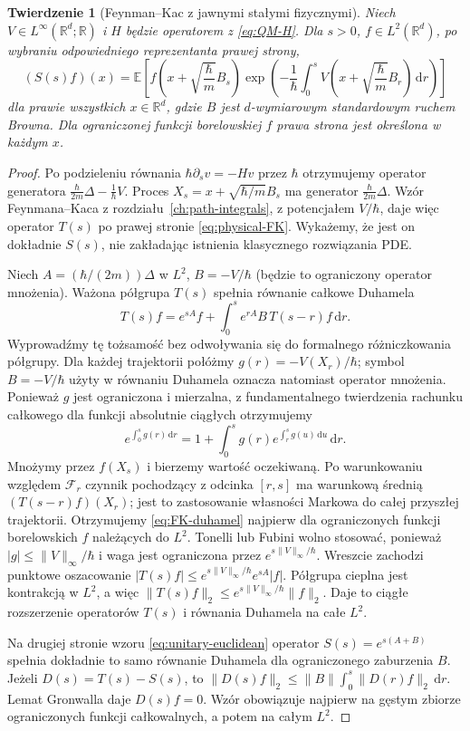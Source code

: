 \documentclass[11pt,a4paper,oneside]{report}
\numberwithin{equation}{chapter}
\theoremstyle{plain}
\newtheorem{twierdzenie}{Twierdzenie}[chapter]
\theoremstyle{definition}
\theoremstyle{remark}
\newcommand{\R}{\mathbb{R}}
\newcommand{\E}{\mathbb{E}}
\newcommand{\calF}{\mathcal{F}}
\newcommand{\dd}{\mathrm{d}}
\begin{document}
\begin{twierdzenie}[Feynman--Kac z jawnymi stałymi fizycznymi]\label{thm:volIII:16:01}
\label{th:physical-FK}
Niech $V\in L^\infty(\R^d;\R)$ i $H$ będzie operatorem
z \eqref{eq:QM-H}. Dla $s>0$, $f\in L^2(\R^d)$,
po wybraniu odpowiedniego reprezentanta prawej strony,
\[
 (S(s)f)(x)=\E\left[
 f\left(x+\sqrt{\frac{\hbar}{m}}B_s\right)
 \exp\left(-\frac1\hbar\int_0^s
 V\left(x+\sqrt{\frac{\hbar}{m}}B_r\right)\,\dd r\right)
 \right]
\tag{16.3}\label{eq:physical-FK}
\]
dla prawie wszystkich $x\in\R^d$, gdzie $B$ jest
$d$-wymiarowym standardowym ruchem Browna.
Dla ograniczonej funkcji borelowskiej $f$ prawa strona
jest określona w każdym $x$.
\end{twierdzenie}
\begin{proof}
Po podzieleniu równania $\hbar\partial_s v=-Hv$ przez
$\hbar$ otrzymujemy operator generatora
$\frac{\hbar}{2m}\Delta-\frac1\hbar V$.
Proces $X_s=x+\sqrt{\hbar/m}B_s$ ma generator
$\frac{\hbar}{2m}\Delta$.
Wzór Feynmana--Kaca z rozdziału~\ref{ch:path-integrals},
z potencjałem $V/\hbar$, daje więc operator $T(s)$ po
prawej stronie \eqref{eq:physical-FK}. Wykażemy, że jest
on dokładnie $S(s)$, nie zakładając istnienia klasycznego
rozwiązania PDE.

Niech $A=(\hbar/(2m))\Delta$ w $L^2$, $B=-V/\hbar$
(będzie to ograniczony operator mnożenia). Ważona
półgrupa $T(s)$ spełnia równanie całkowe Duhamela
\[
 T(s)f=e^{sA}f+\int_0^s e^{rA}B\,T(s-r)f\,\dd r.
\tag{16.4}\label{eq:FK-duhamel}
\]
Wyprowadźmy tę tożsamość bez odwoływania się do
formalnego różniczkowania półgrupy. Dla każdej trajektorii
połóżmy $g(r)=-V(X_r)/\hbar$; symbol $B=-V/\hbar$
użyty w równaniu Duhamela oznacza natomiast operator mnożenia.
Ponieważ $g$ jest ograniczona i mierzalna, z fundamentalnego
twierdzenia rachunku całkowego dla funkcji absolutnie
ciągłych otrzymujemy
\[
 e^{\int_0^s g(r)\,\dd r}
 =1+\int_0^s g(r)e^{\int_r^s g(u)\,\dd u}\,\dd r.
\]
Mnożymy przez $f(X_s)$ i bierzemy wartość oczekiwaną.
Po warunkowaniu względem $\calF_r$ czynnik pochodzący
z odcinka $[r,s]$ ma warunkową średnią
$(T(s-r)f)(X_r)$; jest to zastosowanie własności Markowa
do całej przyszłej trajektorii. Otrzymujemy
\eqref{eq:FK-duhamel} najpierw dla ograniczonych
funkcji borelowskich $f$ należących do $L^2$.
Tonelli lub Fubini wolno stosować, ponieważ
$|g|\le\|V\|_\infty/\hbar$ i waga jest ograniczona przez
$e^{s\|V\|_\infty/\hbar}$.
Wreszcie zachodzi punktowe oszacowanie
$|T(s)f|\le e^{s\|V\|_\infty/\hbar}e^{sA}|f|$.
Półgrupa cieplna jest kontrakcją w $L^2$, a więc
$\|T(s)f\|_2\le e^{s\|V\|_\infty/\hbar}\|f\|_2$.
Daje to ciągłe rozszerzenie operatorów $T(s)$ i
równania Duhamela na całe $L^2$.

Na drugiej stronie wzoru \eqref{eq:unitary-euclidean}
operator $S(s)=e^{s(A+B)}$ spełnia dokładnie to samo
równanie Duhamela dla ograniczonego zaburzenia $B$.
Jeżeli $D(s)=T(s)-S(s)$, to
$\|D(s)f\|_2\le\|B\|\int_0^s\|D(r)f\|_2\,\dd r$.
Lemat Gronwalla daje $D(s)f=0$. Wzór obowiązuje
najpierw na gęstym zbiorze ograniczonych funkcji
całkowalnych, a potem na całym $L^2$.
\end{proof}
\end{document}
